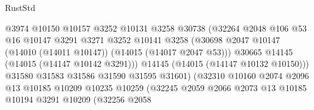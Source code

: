 \begin{lexlean}{RustStd}
\begin{coremodule}
                                        @3974
                                        @10150
                                        @10157
                                        @3252
                                        @10131
                                        @3258
                                        @30738
                                        (@32264
                                          @2048
                                          @106
                                          @53
                                          @16
                                          @10147
                                          @3291
                                          @3271
                                          @3252
                                          @10141
                                          @3258
                                          (@30698
                                            @2047
                                            @10147
                                            (@14010 (@14011 @10147))
                                            (@14015 (@14017 @2047 @53)))
                                          @30665
                                          @14145
                                          (@14015 (@14147 @10142 @3291)))
                                        @14145
                                        (@14015 (@14147 @10132 @10150)))
                                      @31580
                                      @31583
                                      @31586
                                      @31590
                                      @31595
                                      @31601)
                                    (@32310
                                      @10160
                                      @2074
                                      @2096
                                      @13
                                      @10185
                                      @10209
                                      @10235
                                      @10259
                                      (@32245
                                        @2059
                                        @2066
                                        @2073
                                        @13
                                        @10185
                                        @10194
                                        @3291
                                        @10209
                                        (@32256
                                          @2058

\end{coremodule}
\end{lexlean}

